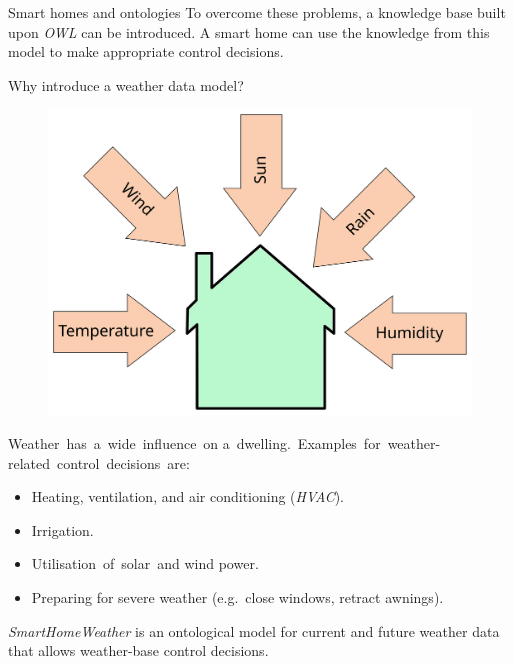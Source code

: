 \documentclass[final,hyperref={pdfpagelabels=true}]{beamer}
\begin{document}
\begin{frame}[fragile]
\begin{columns}[t]
\begin{column}{.45\textwidth}
\begin{block}{Smart homes and ontologies}
	\vspace{.5em}
	To overcome these problems, a knowledge
	base built upon \emph{OWL} can be introduced.
	A smart home can use the knowledge from this
	model to make appropriate control decisions.
      \end{block}

      \begin{block}{Why introduce a weather data model?}
        \begin{figure}
	  \vspace{-.5em}
	  \centering
	  \includegraphics[width=.45\textwidth]{figures/inkscape/house}
	\end{figure}

	\vspace{-1.5em}
	
	\mbox{Weather has a wide influence on}
	\mbox{a dwelling. Examples for weather-}
	\mbox{related control decisions are:}
	
	\begin{itemize}
  	  \item Heating, ventilation, and air conditioning (\emph{HVAC}).
	  \item Irrigation.
	  \item \mbox{Utilisation of solar and} wind power.
	\end{itemize}

	\begin{itemize}
	  \item Preparing for severe weather (e.g.\ close windows, retract awnings).
	\end{itemize}

	\emph{SmartHomeWeather} is an ontological model for current and future weather data that allows weather-base control decisions.
      \end{block}


\end{column}
\end{columns}
\end{frame}
\end{document}
